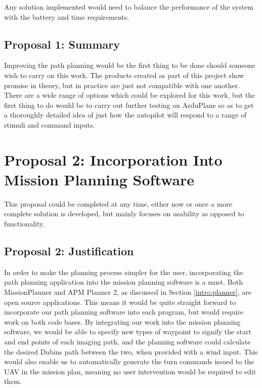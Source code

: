 Any solution implemented would need to balance the performance of the system with the battery and time requirements.

\subsection{Proposal 1: Summary}
\label{future:proposal1:summary}
Improving the path planning would be the first thing to be done should someone wish to carry on this work. The products created as part of this project show promise in theory, but in practice are just not compatible with one another. There are a wide range of options which could be explored for this work, but the first thing to do would be to carry out further testing on ArduPlane so as to get a thoroughly detailed idea of just how the autopilot will respond to a range of stimuli and command inputs.

\section{Proposal 2: Incorporation Into Mission Planning Software}
\label{future:missionplanner}
This proposal could be completed at any time, either now or once a more complete solution is developed, but mainly focuses on usability as opposed to functionality. 

\subsection{Proposal 2: Justification} 
\label{future:proposal2:justification}
In order to make the planning process simpler for the user, incorporating the path planning application into the mission planning software is a must. Both MissionPlanner and APM Planner 2, as discussed in Section \ref{intro:planner}, are open source applications. This means it would be quite straight forward to incorporate our path planning software into each program, but would require work on both code bases. By integrating our work into the mission planning software, we would be able to specify new types of waypoint to signify the start and end points of each imaging path, and the planning software could calculate the desired Dubins path between the two, when provided with a wind input. This would also enable us to automatically generate the turn commands issued to the UAV in the mission plan, meaning no user intervention would be required to edit them. 


